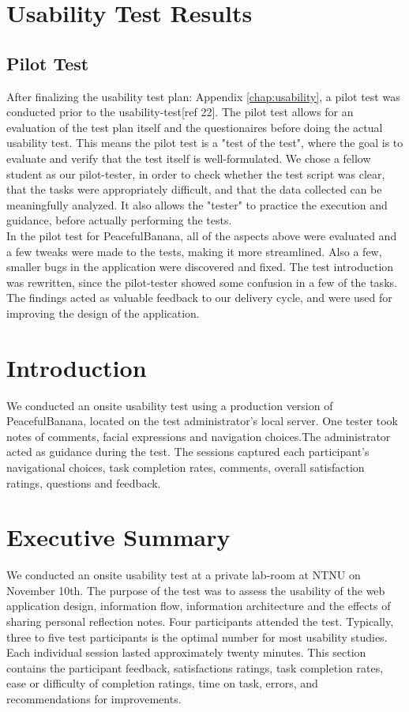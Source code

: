 \section{Usability Test Results}
\subsection{Pilot Test}
After finalizing the usability test plan: Appendix \ref{chap:usability}, a pilot test was conducted prior to the usability-test[ref 22]. The pilot test allows for an evaluation of the test plan itself and the questionaires before doing the actual usability test. This means the pilot test is a "test of the test", where the goal is to evaluate and verify that the test itself is well-formulated. We chose a fellow student as our pilot-tester, in order to check whether the test script was clear, that the tasks were appropriately difficult, and that the data collected can be meaningfully analyzed. 
It also allows the "tester" to practice the execution and guidance, before actually performing the tests. \\
In the pilot test for PeacefulBanana, all of the aspects above were evaluated and a few tweaks were made to the tests, making it more streamlined. Also a few, smaller bugs in the application were discovered and fixed. The test introduction was rewritten, since the pilot-tester showed some confusion in a few of the tasks. 
The findings acted as valuable feedback to our delivery cycle, and were used for improving the design of the application. 
\section{Introduction}
We conducted an onsite usability test using a production version of PeacefulBanana, located on the test administrator’s local server. One tester took notes of comments, facial expressions and navigation choices.The administrator acted as guidance during the test. The sessions captured each participant’s navigational choices, task completion rates, comments, overall satisfaction ratings, questions and feedback.
\section{Executive Summary}
We conducted an onsite usability test at a private lab-room at NTNU on November 10th. The purpose of the test was to assess the usability of the web application design, information flow, information architecture and the effects of sharing personal reflection notes.
Four participants attended the test. Typically, three to five test participants is the optimal number for most usability studies\cite{nielsen1993mathematical}. Each individual session lasted approximately twenty minutes.
This section contains the participant feedback, satisfactions ratings, task completion rates, ease or difficulty of completion ratings, time on task, errors, and recommendations for improvements.

